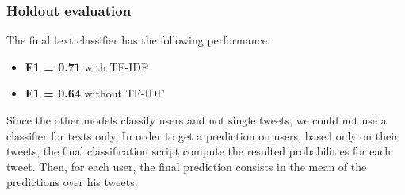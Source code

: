\subsubsection{Holdout evaluation}
The final text classifier has the following performance:
\begin{itemize}
	\item[\PencilRight] \textbf{F1 = 0.71} with TF-IDF
	\item[\PencilRight] \textbf{F1 = 0.64} without TF-IDF
\end{itemize}

Since the other models classify users and not single tweets, we could not use a classifier for texts only.
In order to get a prediction on users, based only on their tweets, the final classification script compute the resulted probabilities for each tweet. Then, for each user, the final prediction consists in the mean of the predictions over his tweets.